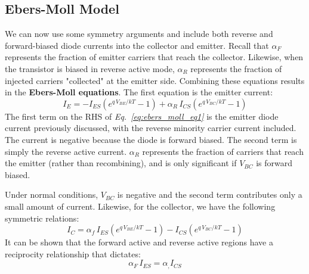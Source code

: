 \subsection{Ebers-Moll Model}
We can now use some symmetry arguments and include both reverse and forward-biased diode currents into the collector and emitter.   Recall that $\alpha_F$ represents the fraction of emitter carriers that reach the collector.  Likewise, when the transistor is biased in reverse active mode, $\alpha_R$ represents the fraction of injected carriers "collected" at the emitter side.  Combining these equations results in the \textbf{Ebers-Moll equations}.  The first equation is the emitter current:
    \begin{equation}
        I_E = -I_{ES} \left(e^{q\,V_{BE}/kT} - 1\right) + \alpha_R\,I_{CS}\left(e^{q\,V_{BC}/kT} - 1\right)
        \label{eq:ebers_moll_eq1}
    \end{equation}
The first term on the RHS of \emph{Eq.~\ref{eq:ebers_moll_eq1}} is the emitter diode current previously discussed, with the reverse minority carrier current included.  The current is negative because the diode is forward biased.  The second term is simply the reverse active current.  $\alpha_R$ represents the fraction of carriers that reach the emitter (rather than recombining), and is only significant if $V_{BC}$ is forward biased.

Under normal conditions, $V_{BC}$ is negative and the second term contributes only a small amount of current.  Likewise, for the collector, we have the following symmetric relations:
    \begin{equation}
        I_C = \alpha_f\,I_{ES} \left(e^{q\,V_{BE}/kT} - 1\right) - I_{CS}\left(e^{q\,V_{BC}/kT} - 1\right)
        \label{eq:ebers_moll_eq2}
    \end{equation}
It can be shown that the forward active and reverse active regions have a reciprocity relationship that dictates:
    \begin{equation}
        \alpha_F\,I_{ES} = \alpha_,I_{CS}
    \end{equation}
